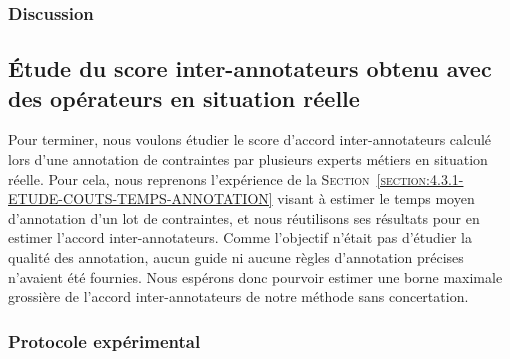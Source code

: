 		\subsubsection{Discussion}
		
		
			
			
			
	\subsection{Étude du score inter-annotateurs obtenu avec des opérateurs en situation réelle}
	\label{section:4.6.3-ETUDE-ROBUSTESSE-SCORE-INTER-ANNOTATEURS}
		
		Pour terminer, nous voulons étudier le score d'accord inter-annotateurs calculé lors d'une annotation de contraintes par plusieurs experts métiers en situation réelle.
		Pour cela, nous reprenons l'expérience de la \textsc{Section~\ref{section:4.3.1-ETUDE-COUTS-TEMPS-ANNOTATION}} visant à estimer le temps moyen d'annotation d'un lot de contraintes, et nous réutilisons ses résultats pour en estimer l'accord inter-annotateurs.
		Comme l'objectif n'était pas d'étudier la qualité des annotation, aucun guide ni aucune règles d'annotation précises n'avaient été fournies.
		Nous espérons donc pourvoir estimer une borne maximale grossière de l'accord inter-annotateurs de notre méthode sans concertation.
		
		\subsubsection{Protocole expérimental}
			
